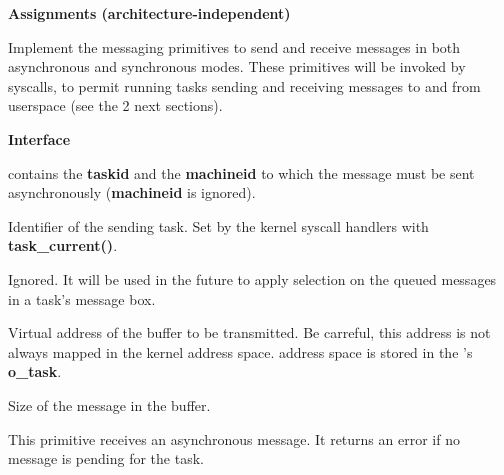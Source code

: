 \begin{itemize}
  \item {\bf Assignments (architecture-independent)}

    Implement the messaging primitives to send and receive messages in both
    asynchronous and synchronous modes. These primitives will be invoked by
    syscalls, to permit running tasks sending and receiving messages to and
    from userspace (see the 2 next sections).

  \item {\bf Interface}

	 {
	   \item {}

	     contains the {\bf taskid} and the {\bf machineid} to which the
	     message must be sent asynchronously (\textbf{machineid} is ignored).

	   \item {}

	     Identifier of the sending task. Set by the kernel syscall
	     handlers with \textbf{task\_current()}.

	   \item {}

	     Ignored. It will be used in the future to apply selection on
	     the queued messages in a task's message box.

	   \item {}

	     Virtual address of the buffer to be transmitted. Be carreful,
	     this address is not always mapped in the kernel address
	     space.  address space is stored in the
	     's \textbf{o\_task}.

	   \item {}

	     Size of the message in the  buffer.
	 }
	 
	 {
	 \item This primitive receives an asynchronous message. It returns
	   an error if no message is pending for the 
	   task.
	     
}
\end{itemize}

